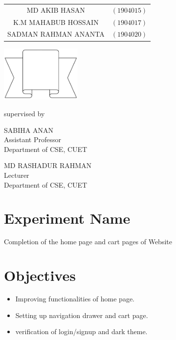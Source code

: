 \documentclass[a4paper,12pt]{report}
\begin{document}
\begin{titlepage}
{		\begin{tabular}{cl}
			MD AKIB HASAN        & $(1904015)$ \\
			K.M MAHABUB HOSSAIN  & $(1904017)$ \\
			SADMAN RAHMAN ANANTA & $(1904020)$ \\
		\end{tabular}
	}
	\parbox[r]{7cm}{
		\vspace{1cm}
		\begin{center}
			\includegraphics[width=4cm, keepaspectratio]{remarks.png}
		\end{center}
	}

	\vspace{0.5cm}
	supervised by

	\parbox[l]{8cm}{\begin{center}

			SABIHA ANAN\\
\footnotesize{Assistant Professor\\
				Department of CSE, CUET}
		\end{center}
	}
	\parbox[r]{8cm}{\begin{center}

			MD RASHADUR RAHMAN\\
\footnotesize{Lecturer \\
				Department of CSE, CUET}
		\end{center}
	}

	\vfill
\end{titlepage}


\onehalfspacing

\section*{Experiment Name}
Completion of the home page and cart pages of Website
\section*{Objectives}
\begin{itemize}
\item Improving functionalities of home page.
\item Setting up navigation drawer and cart page.
\item verification of login/signup and dark theme.
\end{itemize}
\end{document}
